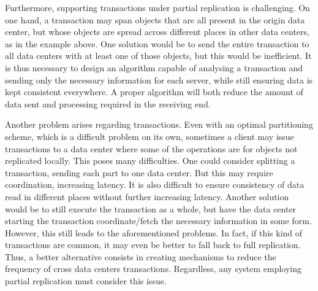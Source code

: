 
Furthermore, supporting transactions under partial replication is challenging.
On one hand, a transaction may span objects that are all present in the origin data center, but whose objects are spread across different places in other data centers, as in the example above.
One solution would be to send the entire transaction to all data centers with at least one of those objects, but this would be inefficient.
It is thus necessary to design an algorithm capable of analysing a transaction and sending only the necessary information for each server, while still ensuring data is kept consistent everywhere.
A proper algorithm will both reduce the amount of data sent and processing required in the receiving end.

Another problem arises regarding transactions.
Even with an optimal partitioning scheme, which is a difficult problem on its own, sometimes a client may issue transactions to a data center where some of the operations are for objects not replicated %
locally.
This poses many difficulties.
One could consider splitting a transaction, sending each part to one data center.
But this may require coordination, increasing latency. 
It is also difficult to ensure consistency of data read in different places without %
further increasing latency.
Another solution would be to still execute the transaction as a whole, but have the data center starting the transaction coordinate/fetch the necessary information in some form.
However, this still leads to the aforementioned problems.
In fact, if this kind of transactions are common, it may even be better to fall back to full replication. %
Thus, a better alternative consists in creating mechanisms to reduce the frequency of cross data centers transactions.
Regardless, any system employing partial replication must consider this issue. %

